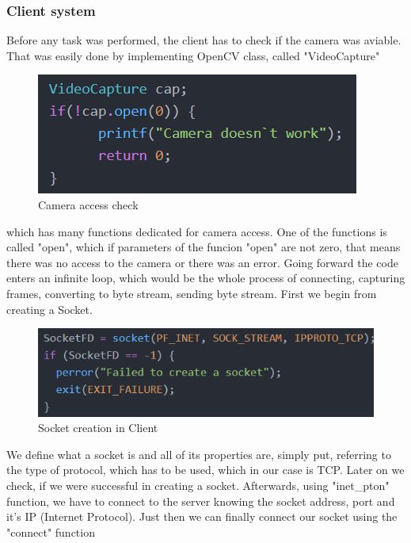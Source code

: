 \documentclass[conference]{IEEEtran}
\begin{document}
\subsubsection{Client system}
Before any task was performed, the client has to check if the camera was aviable. That was easily done by implementing OpenCV class, called "VideoCapture"
\begin{figure}[h!]
	\includegraphics[width=\linewidth]{ClientCodeExample1.png}
	\caption{Camera access check}
	\label{fig:CCE1}
\end{figure}
which has many functions dedicated for camera access. One of the functions is called "open", which if parameters of the funcion "open" are not zero, that means there was no access to the camera or there was an error.
\newline
Going forward the code enters an infinite loop, which would be the whole process of connecting, capturing frames, converting to byte stream, sending byte stream. First we begin from creating a Socket.
\begin{figure}[h!]
	\includegraphics[width=\linewidth]{ClientCodeExample2.png}
	\caption{Socket creation in Client}
	\label{fig:CCE2}
\end{figure}
We define what a socket is and all of its properties are, simply put, referring to the type of protocol, which has to be used, which in our case is TCP. Later on we check, if we were successful in creating a socket.
\newline
Afterwards, using "inet\_pton" function, we have to connect to the server knowing the socket address, port and it's IP (Internet Protocol). Just then we can finally connect our socket using the "connect" function
\end{document}
